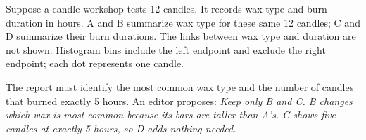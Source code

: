 \documentclass[12pt]{extarticle}
\begin{document}
\pagestyle{empty}


\noindent\begin{minipage}[t]{0.57\linewidth}
\vspace{0pt}
Suppose a candle workshop tests 12 candles. It records wax type and burn duration in hours. A and B summarize wax type for these same 12 candles; C and D summarize their burn durations. The links between wax type and duration are not shown. Histogram bins include the left endpoint and exclude the right endpoint; each dot represents one candle.\par\smallskip
The report must identify the most common wax type and the number of candles that burned exactly 5 hours. An editor proposes: \emph{Keep only B and C. B changes which wax is most common because its bars are taller than A's. C shows five candles at exactly 5 hours, so D adds nothing needed.}\par
\end{minipage}\hfill
\end{document}
